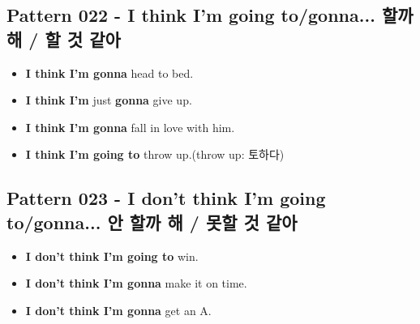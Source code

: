 \documentclass[11pt]{oblivoir}
\begin{document}
\subsection{Pattern 022 - I think I'm going to/gonna... \texttildelow 할까 해 / \texttildelow 할 것 같아}
\begin{itemize}
  \item \textbf{I think I'm gonna} head to bed.
  \item \textbf{I think I'm} just \textbf{gonna} give up.
  \item \textbf{I think I'm gonna} fall in love with him.
  \item \textbf{I think I'm going to} throw up.(throw up: 토하다)
\end{itemize}

\subsection{Pattern 023 - I don't think I'm going to/gonna... \texttildelow 안 할까 해 / \texttildelow 못할 것 같아}
\begin{itemize}
  \item \textbf{I don't think I'm going to} win.
  \item \textbf{I don't think I'm gonna} make it on time.
  \item \textbf{I don't think I'm gonna} get an A.
\end{itemize}
\end{document}
